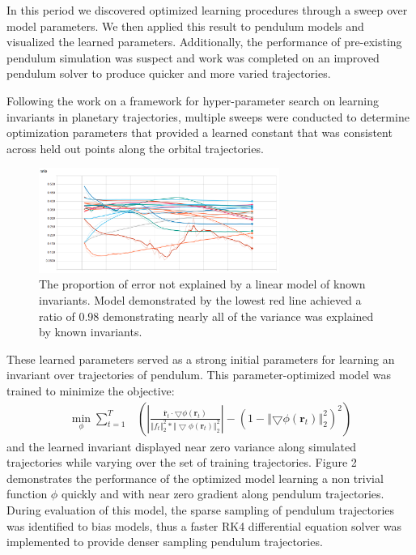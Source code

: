 \documentclass[10pt,letterpaper]{report}
\author{Brandon Houghton}
\begin{document}
In this period we discovered optimized learning procedures through a sweep over model parameters. We then applied this result to pendulum models and visualized the learned parameters. Additionally, the performance of pre-existing pendulum simulation was suspect and work was completed on an improved pendulum solver to produce quicker and more varied trajectories.

Following the work on a framework for hyper-parameter search on learning invariants in planetary trajectories, multiple sweeps were conducted to determine optimization parameters that provided a learned constant that was consistent across held out points along the orbital trajectories. 

\begin{figure}
	\begin{center}
		\includegraphics[width=0.7\textwidth]{images/sweep_35_ratio.png}
		\caption{\small The proportion of error not explained by a linear model of known invariants. Model demonstrated by the lowest red line achieved a ratio of  0.98 demonstrating nearly all of the variance was explained by known invariants. }
	\end{center}	
\end{figure}

These learned parameters served as a strong initial parameters for learning an invariant over trajectories of pendulum. This parameter-optimized model was trained to minimize the objective:
\begin{align}
\min_{\phi} \sum^{T}_{t = 1} &  
\left( \left\vert
\frac{\dot{\pmb{r}_t} \cdot \bigtriangledown \phi \left( \pmb{r}_t \right)}{{\Vert f_t \Vert}^2_2 * {\Vert \bigtriangledown \phi (\pmb{r}_t) \Vert}^2_2}
\right \vert
- \left( 1-\left\Vert \bigtriangledown \phi \left( \pmb{r}_t \right) \right\Vert^2_2 \right)^2 \right)
\end{align}
and the learned invariant displayed near zero variance along simulated trajectories while varying over the set of training trajectories. Figure 2 demonstrates the performance of the optimized model learning a non trivial function $\phi$ quickly and with near zero gradient along pendulum trajectories. During evaluation of this model, the sparse sampling of pendulum trajectories was identified to bias models, thus a faster RK4 differential equation solver was implemented to provide denser sampling pendulum trajectories.
\end{document}
